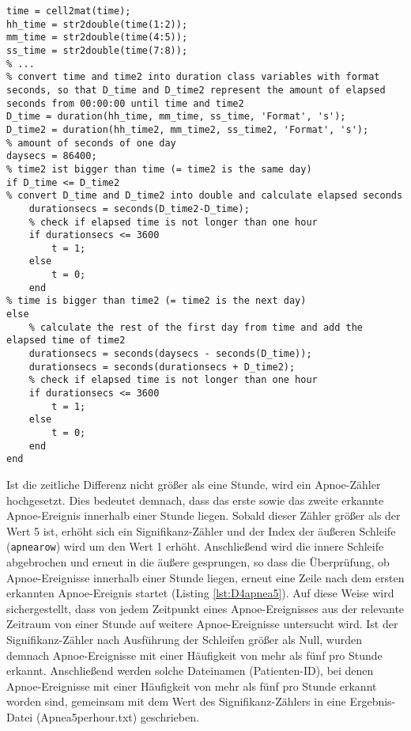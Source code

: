 \begin{lstlisting}[caption={Implementierung Kriterium D4 in Funktion subtract\_timestrings.m}, label={lst:D4time}]
time = cell2mat(time);
hh_time = str2double(time(1:2));
mm_time = str2double(time(4:5));
ss_time = str2double(time(7:8));
% ...
% convert time and time2 into duration class variables with format seconds, so that D_time and D_time2 represent the amount of elapsed seconds from 00:00:00 until time and time2
D_time = duration(hh_time, mm_time, ss_time, 'Format', 's');
D_time2 = duration(hh_time2, mm_time2, ss_time2, 'Format', 's');
% amount of seconds of one day
daysecs = 86400;
% time2 ist bigger than time (= time2 is the same day)
if D_time <= D_time2
% convert D_time and D_time2 into double and calculate elapsed seconds
	durationsecs = seconds(D_time2-D_time);
    % check if elapsed time is not longer than one hour
    if durationsecs <= 3600
    	t = 1;
    else
        t = 0;
    end
% time is bigger than time2 (= time2 is the next day)
else
    % calculate the rest of the first day from time and add the elapsed time of time2
    durationsecs = seconds(daysecs - seconds(D_time));
    durationsecs = seconds(durationsecs + D_time2);
    % check if elapsed time is not longer than one hour
    if durationsecs <= 3600
        t = 1;
    else
        t = 0;
    end
end
\end{lstlisting}

Ist die zeitliche Differenz nicht größer als eine Stunde, wird ein Apnoe-Zähler hochgesetzt. Dies bedeutet demnach, dass das erste sowie das zweite erkannte Apnoe-Ereignis innerhalb einer Stunde liegen. Sobald dieser Zähler größer als der Wert 5 ist, erhöht sich ein Signifikanz-Zähler und der Index der äußeren Schleife (\texttt{apnearow}) wird um den Wert 1 erhöht. Anschließend wird die innere Schleife abgebrochen und erneut in die äußere gesprungen, so dass die Überprüfung, ob Apnoe-Ereignisse innerhalb einer Stunde liegen, erneut eine Zeile nach dem ersten erkannten Apnoe-Ereignis startet (Listing \ref{lst:D4apnea5}). Auf diese Weise wird sichergestellt, dass von jedem Zeitpunkt eines Apnoe-Ereignisses aus der relevante Zeitraum von einer Stunde auf weitere Apnoe-Ereignisse untersucht wird. Ist der Signifikanz-Zähler nach Ausführung der Schleifen größer als Null, wurden demnach Apnoe-Ereignisse mit einer Häufigkeit von mehr als fünf pro Stunde erkannt. Anschließend werden solche Dateinamen (Patienten-ID), bei denen Apnoe-Ereignisse mit einer Häufigkeit von mehr als fünf pro Stunde erkannt worden sind, gemeinsam mit dem Wert des Signifikanz-Zählers in eine Ergebnis-Datei (Apnea5perhour.txt) geschrieben.\\

